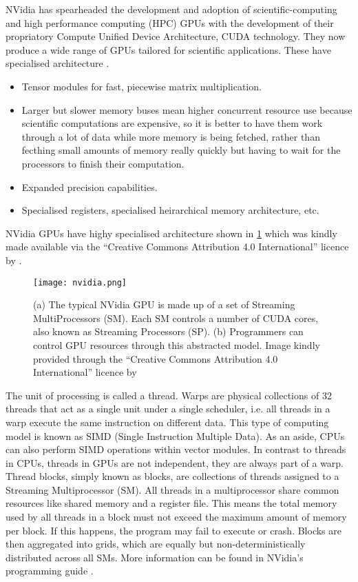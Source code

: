 NVidia has spearheaded the development and adoption of scientific-computing and high performance computing (HPC) GPUs with the development of their propriatory Compute Unified Device Architecture, CUDA technology. They now produce a wide range of GPUs tailored for scientific applications. These have specialised architecture \cite{nvidia}.
\begin{itemize}
  \item Tensor modules for fast, piecewise matrix multiplication.
  \item Larger but slower memory buses mean higher concurrent resource use because scientific computations are expensive, so it is better to have them work through a lot of data while more memory is being fetched, rather than fecthing small amounts of memory really quickly but having to wait for the processors to finish their computation.
  \item Expanded precision capabilities.
  \item Specialised registers, specialised heirarchical memory architecture, etc.
\end{itemize}

NVidia GPUs have highy specialised architecture shown in \cref{gpuarch} which was kindly made available via the ``Creative Commons Attribution 4.0 International'' licence by \citeauthor{gpuarch}.
\begin{figure}
  \centering
  \texttt{[image: nvidia.png]}
  \caption{(a) The typical NVidia GPU is made up of a set of Streaming MultiProcessors (SM). Each SM controls a number of CUDA cores, also known as Streaming Processors (SP). (b) Programmers can control GPU resources through this abstracted model. Image kindly provided through the ``Creative Commons Attribution 4.0 International'' licence by \cite{gpuarch}}
  \label{gpuarch}
\end{figure}
The unit of processing is called a thread. Warps are physical collections of 32 threads that act as a single unit under a single scheduler, i.e. all threads in a warp execute the same instruction on different data. This type of computing model is known as SIMD (Single Instruction Multiple Data). As an aside, CPUs can also perform SIMD operations within vector modules. In contrast to threads in CPUs,
threads in GPUs are not independent, they are always part of a warp. Thread blocks, simply known as blocks, are collections of threads assigned to a Streaming Multiprocessor (SM). All threads in a multiprocessor share common resources like shared memory and a register file. This means the total memory used by all threads in a block must not exceed the maximum amount of memory per block. If this happens, the program may fail to execute or crash. Blocks are then aggregated into grids, which are equally but non-deterministically distributed across all SMs. More information can be found in NVidia's programming guide \cite{nvidia}.

